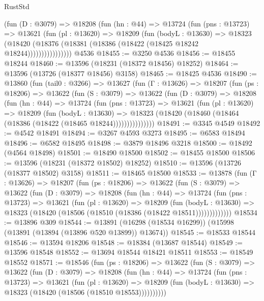 \begin{lexlean}{RustStd}
\begin{coremodule}
              (fun (D : @3079) =>
              @18208
                (fun (hn : @44) =>
                @13724
                  (fun (pns : @13723) =>
                  @13621
                    (fun (pl : @13620) =>
                    @18209
                      (fun (bodyL : @13630) =>
                      @18323
                        (@18420
                          (@18376 (@18381 (@18386 (@18422 (@18425 @18242 @18244))))))))))))))))
    @4536
@18455 := @3250 @4536
@18456 := @18455 @18244
@18460 := @13596 (@18231 (@18372 @18456) @18252)
@18464 := @13596 (@13726 (@18377 @18456) @3158)
@18465 := @18425 @4536
@18490 := @13860
    (fun (tail0 : @3266) =>
    @13627
      (fun (Γ : @13626) =>
      @18207
        (fun (ps : @18206) =>
        @13622
          (fun (S : @3079) =>
          @13622
            (fun (D : @3079) =>
            @18208
              (fun (hn : @44) =>
              @13724
                (fun (pns : @13723) =>
                @13621
                  (fun (pl : @13620) =>
                  @18209
                    (fun (bodyL : @13630) =>
                    @18323 (@18420 (@18460 (@18464 (@18386 (@18422 (@18465 @18244)))))))))))))))
@18491 := @3345 @4549
@18492 := @4542 @18491
@18494 := @3267 @4593 @3273
@18495 := @6583 @18494
@18496 := @6582 @18495
@18498 := @3879 @18496 @3218
@18500 := @18492 (@4564 @18498)
@18501 := @18490 @18500
@18502 := @18455 @18500
@18506 := @13596 (@18231 (@18372 @18502) @18252)
@18510 := @13596 (@13726 (@18377 @18502) @3158)
@18511 := @18465 @18500
@18533 := @13878
    (fun (Γ : @13626) =>
    @18207
      (fun (ps : @18206) =>
      @13622
        (fun (S : @3079) =>
        @13622
          (fun (D : @3079) =>
          @18208
            (fun (hn : @44) =>
            @13724
              (fun (pns : @13723) =>
              @13621
                (fun (pl : @13620) =>
                @18209
                  (fun (bodyL : @13630) =>
                  @18323 (@18420 (@18506 (@18510 (@18386 (@18422 @18511)))))))))))))
@18534 := @13896 @309
@18544 := @13891 (@16298 (@18534 @16299)) (@15998 (@13891 (@13894 (@13896 @520 @13899)) @13674))
@18545 := @18533 @18544
@18546 := @13594 @18206
@18548 := @18384 (@13687 @18544)
@18549 := @13596 @18548
@18552 := @13694 @18544 @18421 @18511
@18553 := @18549 @18552
@18571 := @18546
    (fun (ps : @18206) =>
    @13622
      (fun (S : @3079) =>
      @13622
        (fun (D : @3079) =>
        @18208
          (fun (hn : @44) =>
          @13724
            (fun (pns : @13723) =>
            @13621
              (fun (pl : @13620) =>
              @18209 (fun (bodyL : @13630) => @18323 (@18420 (@18506 (@18510 @18553))))))))))

\end{coremodule}
\end{lexlean}

